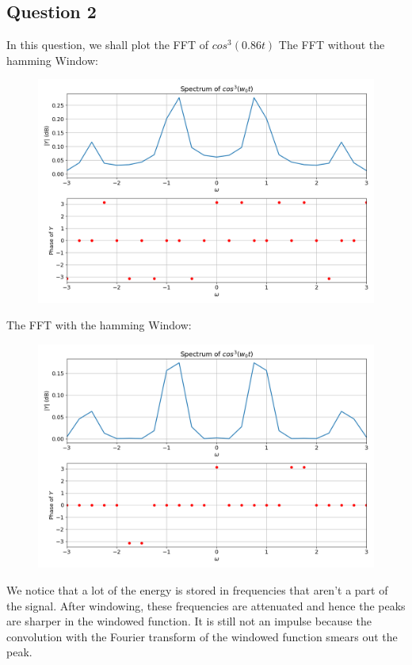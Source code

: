 \documentclass{article}
\begin{document}
\subsection{Question 2}

In this question, we shall plot the FFT of $cos^3(0.86t)$
The FFT without the hamming Window:
\begin{figure}[!tbh]
\centering
\includegraphics[scale=0.4]{plots/cos^3_wo.png}
\label{fig:8}
\end{figure}


The FFT with the hamming Window:
\begin{figure}[!tbh]
\centering
\includegraphics[scale=0.4]{plots/cos^3_with.png}
\label{fig:9}
\end{figure}

We notice that a lot of the energy is stored in frequencies that aren't a part of the signal. 
After windowing, these frequencies are attenuated and hence the peaks are sharper in the windowed function. 
It is still not an impulse because the convolution with the Fourier transform of the windowed function smears out the peak.
\end{document}
